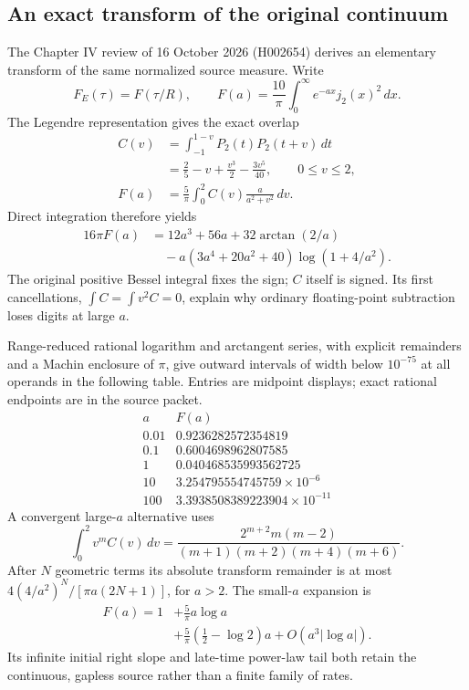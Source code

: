 \subsection{An exact transform of the original continuum}
\label{subsec:actual-continuum-transform-update}
The Chapter IV review of 16 October 2026 (H002654) derives an elementary transform of the same normalized
source measure. Write
\[
 F_E(\tau)=F(\tau/R),\qquad
 F(a)=\frac{10}{\pi}\int_0^\infty e^{-ax}j_2(x)^2\,dx.
\]
The Legendre representation gives the exact overlap
\begin{align*}
 C(v)&=\int_{-1}^{1-v}P_2(t)P_2(t+v)\,dt\\
 &=\frac25-v+\frac{v^3}{2}-\frac{3v^5}{40},
       \qquad 0\leq v\leq2,\\
 F(a)&=\frac5\pi\int_0^2 C(v)\frac{a}{a^2+v^2}\,dv.
\end{align*}
Direct integration therefore yields
\begin{align}
 16\pi F(a)&=12a^3+56a+32\arctan(2/a)\nonumber\\
 &\quad-a(3a^4+20a^2+40)\log(1+4/a^2).
 \label{eq:exact-continuum-transform-update}
\end{align}
The original positive Bessel integral fixes the sign; $C$ itself is signed.
Its first cancellations, $\int C=\int v^2C=0$, explain why ordinary
floating-point subtraction loses digits at large $a$.

Range-reduced rational logarithm and arctangent series, with explicit
remainders and a Machin enclosure of $\pi$, give outward intervals of
width below $10^{-75}$ at all operands in the following table. Entries
are midpoint displays; exact rational endpoints are in the source packet.
\[
 \begin{array}{c|c}
 a&F(a)\\\hline
 0.01&0.9236282572354819\\
 0.1&0.6004698962807585\\
 1&0.040468535993562725\\
 10&3.254795554745759\times10^{-6}\\
 100&3.3938508389223904\times10^{-11}
 \end{array}
\]
A convergent large-$a$ alternative uses
\[
 \int_0^2v^mC(v)\,dv
 =\frac{2^{m+2}m(m-2)}{(m+1)(m+2)(m+4)(m+6)}.
\]
After $N$ geometric terms its absolute transform remainder is at most
$4(4/a^2)^N/[\pi a(2N+1)]$, for $a>2$. The small-$a$ expansion is
\[
 \begin{aligned}
 F(a)=1&+\frac5\pi a\log a\\
       &+\frac5\pi\left(\frac12-\log2\right)a
         +O(a^3|\log a|).
 \end{aligned}
\]
Its infinite initial right slope and late-time power-law tail both retain
the continuous, gapless source rather than a finite family of rates.

